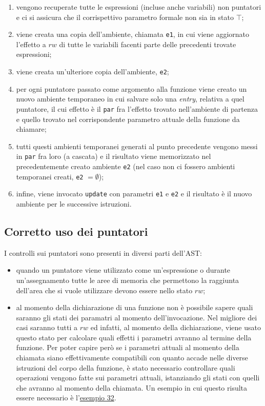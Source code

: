 \documentclass[../report.tex]{subfiles}
\begin{document}
\begin{enumerate}
    \item vengono recuperate tutte le espressioni (incluse anche variabili) non puntatori e ci si assicura che il corrispettivo parametro formale non sia in stato $\top$;
    \item viene creata una copia dell'ambiente, chiamata \verb|e1|, in cui viene aggiornato l'effetto a $rw$ di tutte le variabili facenti parte delle precedenti trovate espressioni;
    \item viene creata un'ulteriore copia dell'ambiente, \verb|e2|;
    \item per ogni puntatore passato come argomento alla funzione viene creato un nuovo ambiente temporaneo in cui salvare solo una \textit{entry}, relativa a quel puntatore, il cui effetto è il \verb|par| fra l'effetto trovato nell'ambiente di partenza e quello trovato nel corrispondente parametro attuale della funzione da chiamare;
    \item tutti questi ambienti temporanei generati al punto precedente vengono messi in \verb|par| fra loro (a cascata) e il risultato viene memorizzato nel precedentemente creato ambiente \verb|e2| (nel caso non ci fossero ambienti temporanei creati, \verb|e2| $= \emptyset{}$);
    \item infine, viene invocato \verb|update| con parametri \verb|e1| e \verb|e2| e il risultato è il nuovo ambiente per le successive istruzioni.
\end{enumerate}

\subsection{Corretto uso dei puntatori}\label{s:corretto_uso_dei_puntatori}
I controlli sui puntatori sono presenti in diversi parti dell'AST:
\begin{itemize}
    \item quando un puntatore viene utilizzato come un'espressione o durante un'assegnamento tutte le aree di memoria che permettono la raggiunta dell'area che si vuole utilizzare devono essere nello stato $rw$;
    \item al momento della dichiarazione di una funzione non \`e possibile sapere quali saranno gli stati dei paramatri al momento dell'invocazione. Nel migliore dei casi saranno tutti a $rw$ ed infatti, al momento della dichiarazione, viene usato questo stato per calcolare quali effetti i parametri avranno al termine della funzione. Per poter capire per\`o se i parametri attuali al momento della chiamata siano effettivamente compatibili con quanto accade nelle diverse istruzioni del corpo della funzione, \`e stato necessario controllare quali operazioni vengono fatte sui parametri attuali, istanziando gli stati con quelli che avranno al momento della chiamata. Un esempio in cui questo risulta essere necessario \`e l'\hyperref[s:esempio32]{esempio 32}.
\end{itemize}
\end{document}
